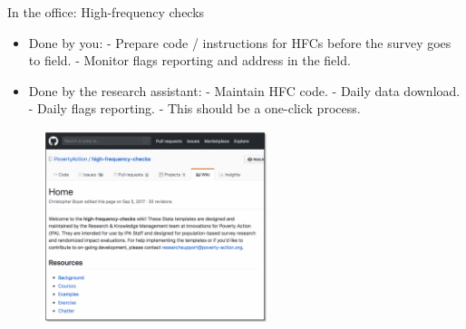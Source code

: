 \documentclass[aspectratio=169]{beamer}
\begin{document}
\begin{frame}[fragile]{In the office: High-frequency checks}
\begin{multicols}{2}	
	
	\begin{itemize}[<default overlay specification>]
		\item<1> Done by you:
			\newline - Prepare code / instructions for HFCs before the survey goes to field.
			\newline - Monitor flags reporting and address in the field.
		\item<1> Done by the research assistant:
			\newline - Maintain HFC code. 
			\newline - Daily data download.
			\newline - Daily flags reporting. 
			\newline - This should be a one-click process.
	\end{itemize}
	
	\begin{figure}
		\centering
		\includegraphics[width=65mm, right]{img/HFCs}
	\end{figure}
	
\end{multicols}
\end{frame}
\end{document}
